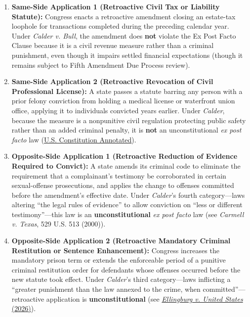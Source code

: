 \documentclass[12pt]{article}
\begin{document}
\begin{enumerate}
  \item \textbf{Same-Side Application 1 (Retroactive Civil Tax or Liability Statute):} Congress enacts a retroactive amendment closing an estate-tax loophole for transactions completed during the preceding calendar year. Under \textit{Calder v. Bull}, the amendment does \textbf{not} violate the Ex Post Facto Clause because it is a civil revenue measure rather than a criminal punishment, even though it impairs settled financial expectations (though it remains subject to Fifth Amendment Due Process review).
  \item \textbf{Same-Side Application 2 (Retroactive Revocation of Civil Professional License):} A state passes a statute barring any person with a prior felony conviction from holding a medical license or waterfront union office, applying it to individuals convicted years earlier. Under \textit{Calder}, because the measure is a nonpunitive civil regulation protecting public safety rather than an added criminal penalty, it is \textbf{not} an unconstitutional \textit{ex post facto} law (\href{https://law.justia.com/constitution/us/article-1/70-ex-post-facto-laws.html}{U.S. Constitution Annotated}).
  \item \textbf{Opposite-Side Application 1 (Retroactive Reduction of Evidence Required to Convict):} A state amends its criminal code to eliminate the requirement that a complainant's testimony be corroborated in certain sexual-offense prosecutions, and applies the change to offenses committed before the amendment's effective date. Under \textit{Calder}'s fourth category---laws altering ``the legal rules of evidence'' to allow conviction on ``less or different testimony''---this law is an \textbf{unconstitutional} \textit{ex post facto} law (see \textit{Carmell v. Texas}, 529 U.S. 513 (2000)).
  \item \textbf{Opposite-Side Application 2 (Retroactive Mandatory Criminal Restitution or Sentence Enhancement):} Congress increases the mandatory prison term or extends the enforceable period of a punitive criminal restitution order for defendants whose offenses occurred before the new statute took effect. Under \textit{Calder}'s third category---laws inflicting a ``greater punishment than the law annexed to the crime, when committed''---retroactive application is \textbf{unconstitutional} (see \href{https://www.supremecourt.gov/opinions/25pdf/24-482_d1oe.pdf}{\textit{Ellingburg v. United States} (2026)}).

\end{enumerate}
\end{document}

